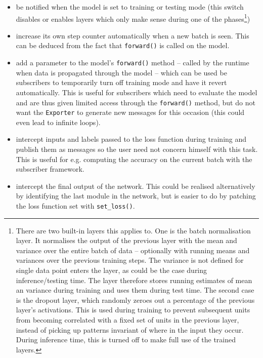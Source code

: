 \begin{itemize}
    \item
        be notified when the model is set to training or testing mode (this
        switch disables or enables layers which only make sense during one of
        the phases\footnote{There are two built-in layers this applies to. One
            is the batch normalisation layer. It normalises the output of the
            previous layer with the mean and variance over the entire batch of
            data -- optionally with running means and variances over the
            previous training steps. The variance is not defined for
            single data point enters the layer, as could be the case during
            inference/testing time. The layer therefore stores running estimates
            of mean an variance during training and uses them during test time.
            The second case is the dropout layer, which
            randomly zeroes out a percentage of the previous layer's
            activations. This is used during training to prevent subsequent
            units from becoming correlated with a fixed set of units in the
            previous layer, instead of picking up patterns invariant of where in
            the input they occur. During inference time, this is turned off to
            make full use of the trained
        layers.})
    \item
        increase its own step counter automatically when a new batch is seen.
        This can be deduced from the fact that \lstinline+forward()+ is called
        on the model.
    \item
        add a parameter to the model's \lstinline{forward()} method -- called by
        the runtime when data is propagated through the model -- which can be
        used be subscribers to temporarily turn off training mode and have it
        revert automatically. This is useful for subscribers which need to
        evaluate the model and are thus given limited access through the
        \lstinline+forward()+ method, but do not want the \lstinline+Exporter+
        to generate new messages for this occasion (this could even lead to
        infinite loops).
    \item
        intercept inputs and labels passed to the loss function during training and
        publish them as messages so the user need not concern himself with
        this task. This is useful for e.g. computing the accuracy on the current
        batch with the subscriber framework.
    \item
        intercept the final output of the network. This could be realised
        alternatively by identifying the last module in the network, but is
        easier to do by patching the loss function set with
        \lstinline+set_loss()+.
\end{itemize}

